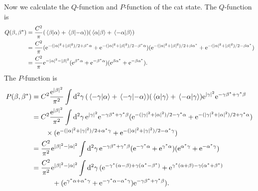 \documentclass[hyperref, a4paper]{article}
\newcommand*{\ee}{\mathrm{e}}
\begin{document}
\begin{itemize}
    Now we calculate the $Q$-function and $P$-function of the cat state.
    The $Q$-function is 
    \[
        \begin{aligned}
            Q(\beta, \beta^*) &= \frac{C^2}{\pi} (\braket*{\beta}{\alpha} + \braket*{\beta}{-\alpha}) (\braket*{\alpha}{\beta} + \braket*{-\alpha}{\beta}) \\
            &= \frac{C^2}{\pi} (\ee^{- (\abs{\alpha}^2 + \abs{\beta}^2) / 2 + \beta^* \alpha} + \ee^{- (\abs{\alpha}^2 + \abs{\beta}^2) / 2 - \beta^* \alpha}) (\ee^{- (\abs{\alpha}^2 + \abs{\beta}^2) / 2 + \beta \alpha^*} + \ee^{- (\abs{\alpha}^2 + \abs{\beta}^2) / 2 - \beta \alpha^*}) \\
            &= \frac{C^2}{\pi} \ee^{- \abs{\alpha}^2 - \abs{\beta}^2} (\ee^{\beta^* \alpha} + \ee^{-\beta^* \alpha}) (\ee^{\beta \alpha^*} + \ee^{- \beta \alpha^*}).
        \end{aligned}
    \]
    The $P$-function is 
    \[
        \begin{aligned}
            P(\beta, \beta^*) &= C^2 \frac{\ee^{\abs{\beta}^2}}{\pi^2} \int \dd[2]{\gamma} (\braket*{-\gamma}{\alpha} + \braket*{-\gamma}{-\alpha}) (\braket*{\alpha}{\gamma} + \braket*{-\alpha}{\gamma}) \ee^{\abs{\gamma}^2} \ee^{- \gamma \beta^* + \gamma^* \beta} \\
            &= C^2 \frac{\ee^{\abs{\beta}^2}}{\pi^2} \int \dd[2]{\gamma} \ee^{\abs{\gamma}^2} \ee^{- \gamma \beta^* + \gamma^* \beta}  (\ee^{- (\abs{\gamma}^2 + \abs{\alpha}^2) / 2 - \gamma^* \alpha} + \ee^{- (\abs{\gamma}^2 + \abs{\alpha}^2) / 2 + \gamma^* \alpha}) \\
            &\quad \quad \times (\ee^{-(\abs{\alpha}^2 + \abs{\gamma}^2) / 2 + \alpha^* \gamma} + \ee^{- (\abs{\alpha}^2 + \abs{\gamma}^2) / 2 - \alpha^* \gamma} ) \\
            &= \frac{C^2}{\pi^2} \ee^{\abs{\beta}^2 - \abs{\alpha}^2} \int \dd[2]{\gamma} \ee^{- \gamma \beta^* + \gamma^* \beta} (\ee^{- \gamma^* \alpha} + \ee^{\gamma^* \alpha}) (\ee^{\alpha^* \gamma} + \ee^{- \alpha^* \gamma}) \\
            &= \frac{C^2}{\pi^2} \ee^{\abs{\beta}^2 - \abs{\alpha}^2} \int \dd[2]{\gamma} (\ee^{-\gamma^* (\alpha - \beta) + \gamma (\alpha^* - \beta^*)} + \ee^{\gamma^* (\alpha + \beta) - \gamma (\alpha^* + \beta^*)} \\
            &\quad \quad \quad + (\ee^{\gamma^* \alpha + \alpha^* \gamma} + \ee^{- \gamma^* \alpha - \alpha^* \gamma}) \ee^{- \gamma \beta^* + \gamma^* \beta} ).
        \end{aligned}
\]
\end{itemize}
\end{document}
